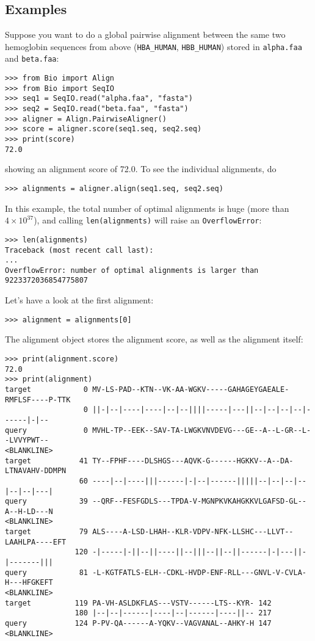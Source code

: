 \subsection{Examples}
\label{sec:pairwise-examples}

Suppose you want to do a global pairwise alignment between the same two
hemoglobin sequences from above (\texttt{HBA\_HUMAN}, \texttt{HBB\_HUMAN})
stored in \texttt{alpha.faa} and \texttt{beta.faa}:

\begin{verbatim}
>>> from Bio import Align
>>> from Bio import SeqIO
>>> seq1 = SeqIO.read("alpha.faa", "fasta")
>>> seq2 = SeqIO.read("beta.faa", "fasta")
>>> aligner = Align.PairwiseAligner()
>>> score = aligner.score(seq1.seq, seq2.seq)
>>> print(score)
72.0
\end{verbatim}

showing an alignment score of 72.0. To see the individual alignments, do

\begin{verbatim}
>>> alignments = aligner.align(seq1.seq, seq2.seq)
\end{verbatim}
In this example, the total number of optimal alignments is huge (more than $4 \times 10^{37}$), and calling \verb+len(alignments)+ will raise an \verb+OverflowError+:

\begin{verbatim}
>>> len(alignments)
Traceback (most recent call last):
...
OverflowError: number of optimal alignments is larger than 9223372036854775807
\end{verbatim}
Let's have a look at the first alignment:

\begin{verbatim}
>>> alignment = alignments[0]
\end{verbatim}

The alignment object stores the alignment score, as well as the alignment
itself:

\begin{verbatim}
>>> print(alignment.score)
72.0
>>> print(alignment)
target            0 MV-LS-PAD--KTN--VK-AA-WGKV-----GAHAGEYGAEALE-RMFLSF----P-TTK
                  0 ||-|--|----|----|--|--||||-----|---||--|--|--|--|------|-|--
query             0 MVHL-TP--EEK--SAV-TA-LWGKVNVDEVG---GE--A--L-GR--L--LVVYPWT--
<BLANKLINE>
target           41 TY--FPHF----DLSHGS---AQVK-G------HGKKV--A--DA-LTNAVAHV-DDMPN
                 60 ----|--|----|||------|-|--|------|||||--|--|--|--|--|--|---|
query            39 --QRF--FESFGDLS---TPDA-V-MGNPKVKAHGKKVLGAFSD-GL--A--H-LD---N
<BLANKLINE>
target           79 ALS----A-LSD-LHAH--KLR-VDPV-NFK-LLSHC---LLVT--LAAHLPA----EFT
                120 -|-----|-||--||----||--|||--||--||------|-|---||-|-------|||
query            81 -L-KGTFATLS-ELH--CDKL-HVDP-ENF-RLL---GNVL-V-CVLA-H---HFGKEFT
<BLANKLINE>
target          119 PA-VH-ASLDKFLAS---VSTV------LTS--KYR- 142
                180 |--|--|------|----|--|------|----||-- 217
query           124 P-PV-QA------A-YQKV--VAGVANAL--AHKY-H 147
<BLANKLINE>
\end{verbatim}

